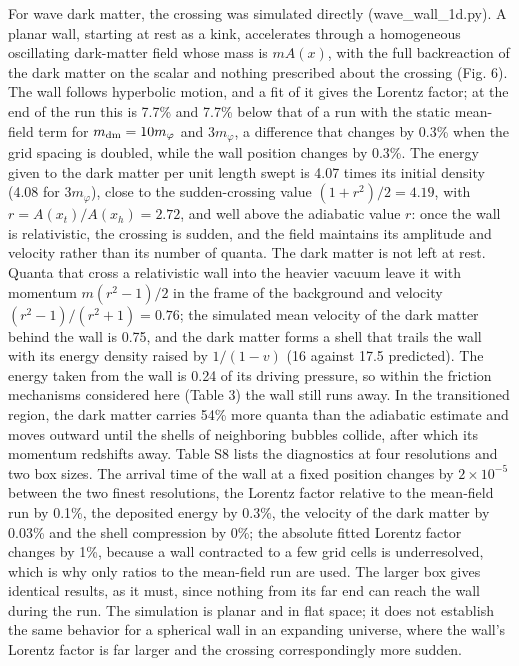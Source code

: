\documentclass[preprint,12pt]{elsarticle}
\begin{document}
For wave dark matter, the crossing was simulated directly (wave\_wall\_1d.py). A planar wall, starting at rest as a kink, accelerates through a homogeneous oscillating dark-matter field whose mass is $mA(x)$, with the full backreaction of the dark matter on the scalar and nothing prescribed about the crossing (Fig. 6). The wall follows hyperbolic motion, and a fit of it gives the Lorentz factor; at the end of the run this is 7.7\% and 7.7\% below that of a run with the static mean-field term for $m_{\rm dm}=10m_\varphi$ and $3m_\varphi$, a difference that changes by 0.3\% when the grid spacing is doubled, while the wall position changes by 0.3\%. The energy given to the dark matter per unit length swept is 4.07 times its initial density (4.08 for $3m_\varphi$), close to the sudden-crossing value $(1+r^2)/2=4.19$, with $r=A(x_t)/A(x_h)=2.72$, and well above the adiabatic value $r$: once the wall is relativistic, the crossing is sudden, and the field maintains its amplitude and velocity rather than its number of quanta. The dark matter is not left at rest. Quanta that cross a relativistic wall into the heavier vacuum leave it with momentum $m(r^2-1)/2$ in the frame of the background and velocity $(r^2-1)/(r^2+1)=0.76$; the simulated mean velocity of the dark matter behind the wall is 0.75, and the dark matter forms a shell that trails the wall with its energy density raised by $1/(1-v)$ (16 against 17.5 predicted). The energy taken from the wall is 0.24 of its driving pressure, so within the friction mechanisms considered here (Table 3) the wall still runs away. In the transitioned region, the dark matter carries 54\% more quanta than the adiabatic estimate and moves outward until the shells of neighboring bubbles collide, after which its momentum redshifts away. Table S8 lists the diagnostics at four resolutions and two box sizes. The arrival time of the wall at a fixed position changes by $2\times10^{-5}$ between the two finest resolutions, the Lorentz factor relative to the mean-field run by 0.1\%, the deposited energy by 0.3\%, the velocity of the dark matter by 0.03\% and the shell compression by 0\%; the absolute fitted Lorentz factor changes by 1\%, because a wall contracted to a few grid cells is underresolved, which is why only ratios to the mean-field run are used. The larger box gives identical results, as it must, since nothing from its far end can reach the wall during the run. The simulation is planar and in flat space; it does not establish the same behavior for a spherical wall in an expanding universe, where the wall's Lorentz factor is far larger and the crossing correspondingly more sudden.
\end{document}

